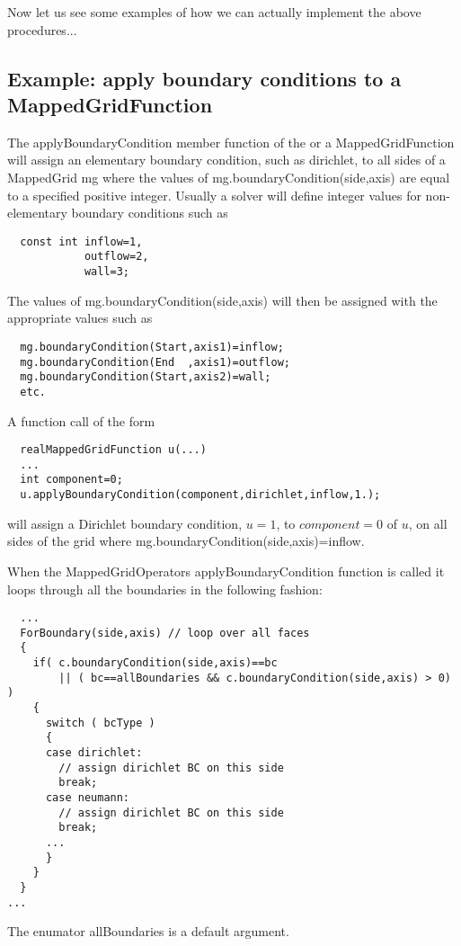 Now let us see some examples of how we can actually
implement the above procedures...

\subsection{Example: apply boundary conditions to a MappedGridFunction} \label{bcExamples}

The {\ff applyBoundaryCondition} member function of the {\ff \MGO} or
a {\ff MappedGridFunction} will assign an elementary boundary
condition, such as {\ff dirichlet}, to all sides of a {\ff MappedGrid mg}
where the values of {\ff mg.boundary\-Condition(side,axis)} are equal
to a specified positive integer. Usually a solver will define integer
values for non-elementary boundary conditions such as 
{\footnotesize
\begin{verbatim}
  const int inflow=1,
            outflow=2,
            wall=3;
\end{verbatim}
}
\noindent The values of 
{\ff mg.boundaryCondition(side,axis)} will then be assigned with the
appropriate values such as 
{\footnotesize
\begin{verbatim}
  mg.boundaryCondition(Start,axis1)=inflow;
  mg.boundaryCondition(End  ,axis1)=outflow;
  mg.boundaryCondition(Start,axis2)=wall;
  etc.
\end{verbatim}
}
\noindent A function call of the form
{\footnotesize
\begin{verbatim}
  realMappedGridFunction u(...)
  ...
  int component=0;
  u.applyBoundaryCondition(component,dirichlet,inflow,1.);
\end{verbatim}
}
\noindent will assign a Dirichlet boundary condition, $u=1$, to $component=0$ of $u$, on all sides of the
grid where {\ff mg.boundaryCondition(side,axis)}{\ff =inflow}.

When the {\ff  MappedGridOperators} {\ff applyBoundaryCondition} function is
called it loops through all the boundaries in the following fashion:
{\footnotesize
\begin{verbatim}
  ...
  ForBoundary(side,axis) // loop over all faces
  {
    if( c.boundaryCondition(side,axis)==bc  
        || ( bc==allBoundaries && c.boundaryCondition(side,axis) > 0) )
    {
      switch ( bcType )
      {
      case dirichlet: 
        // assign dirichlet BC on this side
        break;
      case neumann:
        // assign dirichlet BC on this side
        break;
      ...
      }     
    }    
  }      
...
\end{verbatim}
}
The enumator {\ff allBoundaries} is a default argument. 

